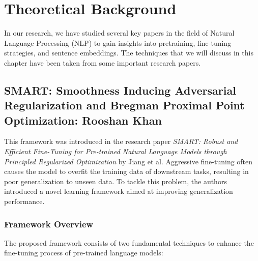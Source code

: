 \chapter{Theoretical Background}
\label{Chapter3}
In our research, we have studied several key papers in the field of Natural Language Processing (NLP) to gain insights into pretraining, fine-tuning strategies, and sentence embeddings. The techniques that we will discuss in this chapter have been taken from some important research papers.
\section{SMART: Smoothness Inducing Adversarial Regularization and Bregman Proximal Point Optimization: Rooshan Khan}
\label{sec:SMART_theory}
This framework was introduced in the research paper \textit{SMART: Robust and Efficient Fine-Tuning for Pre-trained Natural Language Models through Principled Regularized Optimization} by Jiang et al. \cite{jiang2019smart}
Aggressive fine-tuning often causes the model to overfit the training data of downstream tasks, resulting in poor generalization to unseen data. To tackle this problem, the authors introduced a novel learning framework aimed at improving generalization performance.

\subsection{Framework Overview}

The proposed framework consists of two fundamental techniques to enhance the fine-tuning process of pre-trained language models:


